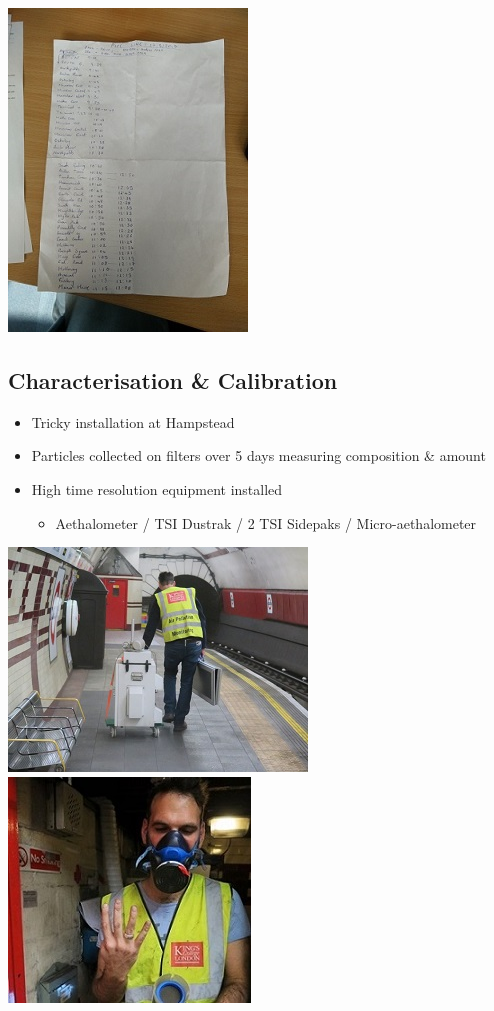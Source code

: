 \documentclass[]{article}
\providecommand{\tightlist}{%
  \setlength{\itemsep}{0pt}\setlength{\parskip}{0pt}}
\begin{document}
\includegraphics{images/Piccadilly_Line_1.jpg}

\hypertarget{characterisation-calibration}{%
\subsection{Characterisation \&
Calibration}\label{characterisation-calibration}}

\begin{itemize}
\tightlist
\item
  Tricky installation at Hampstead
\item
  Particles collected on filters over 5 days measuring composition \&
  amount
\item
  High time resolution equipment installed

  \begin{itemize}
  \tightlist
  \item
    Aethalometer / TSI Dustrak / 2 TSI Sidepaks / Micro-aethalometer
  \end{itemize}
\end{itemize}

\includegraphics{images/hampstead_equipment.jpg}
\includegraphics{images/max_characterisation.jpg}
\end{document}
